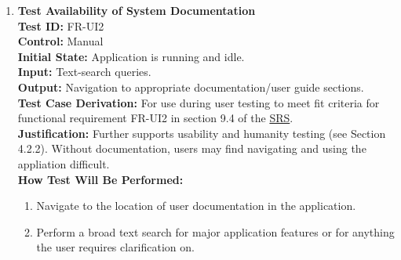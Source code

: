 \documentclass[12pt, titlepage]{article}
\begin{document}
\begin{enumerate}
    \item \textbf{Test Availability of System Documentation} \\
      \newline
      \textbf{Test ID:} FR-UI2 \\
      \textbf{Control:} Manual \\
      \textbf{Initial State:} Application is running and idle. \\
      \textbf{Input:} Text-search queries. \\
      \textbf{Output:} Navigation to appropriate documentation/user guide sections. \\
      \textbf{Test Case Derivation:} For use during user testing to meet fit criteria for functional requirement FR-UI2 in section 
      9.4 of the \href{https://github.com/emilyperica/ScoreGen/blob/main/docs/SRS-Volere/SRS.pdf}{SRS}. \\
      \textbf{Justification:} Further supports usability and humanity testing (see Section 4.2.2). Without documentation, 
      users may find navigating and using the appliation difficult.\\
      \textbf{How Test Will Be Performed:}
      \begin{enumerate}
          \item Navigate to the location of user documentation in the application.
          \item Perform a broad text search for major application features or for anything the user requires clarification on.
      \end{enumerate}
    

\end{enumerate}
\end{document}
